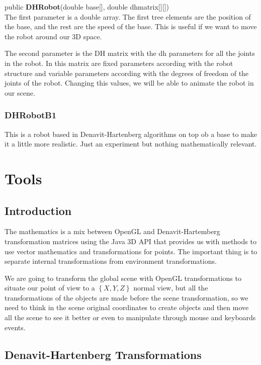 \documentclass[12pt,a4paper,oneside,english]{book}
\begin{document}
\noindent
\textcolor[rgb]{0.00,0.00,1.00}{public} \textbf{DHRobot}(\textcolor[rgb]{0.00,0.00,1.00}{double} base[], \textcolor[rgb]{0.00,0.00,1.00}{double} dhmatrix[][])\\

The first parameter is a double array. The first tree elements are the position of the base, and the rest are the speed of the base. This is useful if we want to move the robot around our 3D space.

The second parameter is the DH matrix with the dh parameters for all the joints in the robot. In this matrix are fixed parameters according with the robot structure and variable parameters according with the degrees of freedom of the joints of the robot. Changing this values, we will be able to animate the robot in our scene.

\subsection{DHRobotB1}

This is a robot based in Denavit-Hartenberg algorithms on top ob a base to make it a little more realistic. Just an experiment but nothing mathematically relevant.

\chapter{Tools}
\label{tools}

\section{Introduction}

The mathematics is a mix between OpenGL and Denavit-Hartemberg transformation matrices using the Java 3D API that provides us with methods to use vector mathematics and transformations for points. The important thing is to separate internal transformations from environment transformations.

We are going to transform the global scene with OpenGL transformations to situate our point of view to a $\left\{X,Y,Z\right\}$ normal view, but all the transformations of the objects are made before the scene transformation, so we need to think in the scene original coordinates to create objects and then move all the scene to see it better or even to manipulate through mouse and keyboards events.

\section{Denavit-Hartenberg Transformations}
\end{document}

